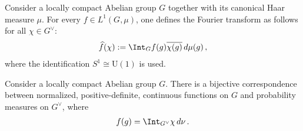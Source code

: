     \begin{construct}
        Consider a locally compact Abelian group $G$ together with its canonical Haar measure $\mu$. For every $f\in L^1(G,\mu)$, one defines the Fourier transform as follows for all $\chi\in G^\vee$:
        \begin{gather}
            \widehat{f}(\chi) := \Int_G f(g)\overline{\chi(g)}\,d\mu(g)\,,
        \end{gather}
        where the identification $S^1\cong\mathrm{U}(1)$ is used.
    \end{construct}

    \begin{theorem}[Bochner]
        Consider a locally compact Abelian group $G$. There is a bijective correspondence between normalized, positive-definite, continuous functions on $G$ and probability measures on $G^\vee$, where
        \begin{gather}
            f(g) = \Int_{G^\vee}\chi\,d\nu\,.
        \end{gather}
    \end{theorem}

